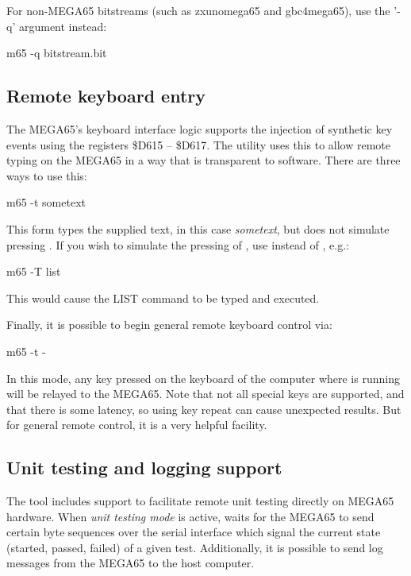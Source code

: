 For non-MEGA65 bitstreams (such as zxunomega65 and gbc4mega65), use the '-q' argument instead:

\begin{screenoutput}
m65 -q bitstream.bit
\end{screenoutput}

\subsection{Remote keyboard entry}

The MEGA65's keyboard interface logic supports the injection of
synthetic key events using the registers \$D615 -- \$D617.
The  utility uses this to allow remote typing on the MEGA65
in a way that is transparent to software.  There are three ways to use
this:

\begin{screenoutput}
m65 -t sometext
\end{screenoutput}

This form types the supplied text, in this case {\em sometext}, but
does not simulate pressing .  If you wish
to simulate the pressing of , use 
instead of , e.g.:

\begin{screenoutput}
m65 -T list
\end{screenoutput}

This would cause the LIST command to be typed and executed.

Finally, it is possible to begin general remote keyboard control via:

\begin{screenoutput}
m65 -t -
\end{screenoutput}

In this mode, any key pressed on the keyboard of the computer
where  is running will be relayed to the MEGA65.  Note that
not all special keys are supported, and that there is some latency, so
using key repeat can cause unexpected results.  But for general remote
control, it is a very helpful facility.

\subsection{Unit testing and logging support}

The  tool includes support to facilitate remote unit testing 
directly on MEGA65 hardware. When \textit{unit testing mode} is active, 
 waits for the MEGA65 to send certain byte sequences over the 
serial interface which signal the current state (started, passed, failed) 
of a given test. Additionally, it is possible to send log messages from 
the MEGA65 to the host computer.

